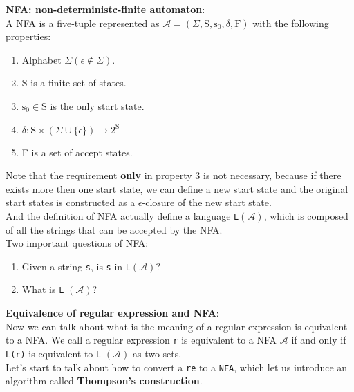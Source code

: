 \documentclass{article}
\begin{document}
\textbf{NFA\@: non-deterministc-finite automaton}:
\\

A NFA is a five-tuple represented as \( \mathcal{A} = (\Sigma, \text{S}, \text{s}_0, \delta, \text{F}) \) with the following properties:

\begin{enumerate}
    \item Alphabet \( \Sigma (\epsilon \notin \Sigma) \).
    \item S is a finite set of states.
    \item \( \text{s}_0 \in \text{S} \) is the only start state.
    \item \( \delta : \text{S} \times (\Sigma \cup \{ \epsilon \}) \to 2^{\text{S}} \)
    \item F is a set of accept states.
\end{enumerate}

Note that the requirement \textbf{only} in property 3 is not necessary, because if there exists more
then one start state, we can define a new start state and the original start states is constructed as
a \( \epsilon\text{-closure} \) of the new start state.
\\

And the definition of NFA actually define a language \texttt{L}\( (\mathcal{A}) \), which is composed of all the strings
that can be accepted by the NFA\@.
\\

Two important questions of NFA\@:
\begin{enumerate}
    \item Given a string \texttt{s}, is \texttt{s} in \texttt{L}\( (\mathcal{A}) \)?
    \item What is \texttt{L} \( (\mathcal{A}) \)?
\end{enumerate}

\textbf{Equivalence of regular expression and NFA}:
\\

Now we can talk about what is the meaning of a regular expression is equivalent to a NFA\@.
We call a regular expression \texttt{r} is equivalent to a NFA \( \mathcal{A} \) if and only if
\texttt{L{(r)}} is equivalent to \texttt{L} \( (\mathcal{A}) \) as two sets.
\\

Let's start to talk about how to convert a \texttt{re} to a \texttt{NFA}, which let us introduce an algorithm called \textbf{Thompson's construction}.
\\
\end{document}
